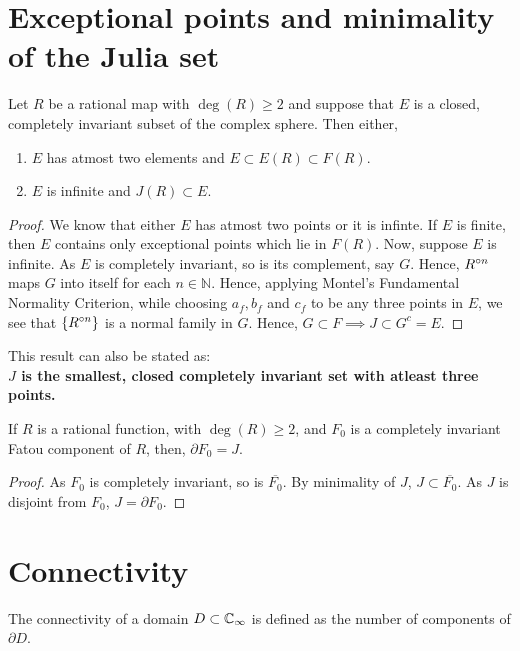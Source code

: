 \section{Exceptional points and minimality of the Julia set}
\begin{theorem}
	Let \( R \) be a rational map with \( \deg(R)\ge 2 \) and suppose that \( E \) is a closed, completely invariant
	subset of the complex sphere. Then either,
	\begin{enumerate}
		\item \( E \) has atmost two elements and \( E \subset E(R) \subset F(R) \).
		\item \( E \) is infinite and \( J(R) \subset E \).
	\end{enumerate}
\end{theorem}
\begin{proof}
	We know that either \( E \) has atmost two points or it is infinte. If \( E \) is finite, then \( E \) contains
	only exceptional points which lie in \( F(R) \). Now, suppose \( E \) is infinite. As \( E \) is completely invariant, so
	is its complement, say \( G \). Hence, \( \ror[n] \) maps \( G \) into itself for each \( n \in \mathbb{N} \). Hence, applying 
	Montel's Fundamental Normality Criterion, while choosing \( a_f,b_f \) and \( c_f \) to be any three points in \( E \),
we see that \( \{\ror[n]\} \) is a normal family in \( G \). Hence, \( G \subset F \implies J \subset G^c=E \).
\end{proof}
\noindent This result can also be stated as:\\
\textbf{\( J \) is the smallest, closed completely invariant set with atleast three points.}

\begin{corollary}\label{thm1.2}
	If \( R \) is a rational function, with \( \deg(R)\ge 2 \), and \( F_0 \) is
	a completely invariant Fatou component of \( R \), then, \( \partial F_0=J \).
\end{corollary}
\begin{proof}
	As \( F_0 \) is completely invariant, so is \( \overline{F_0}  \). By minimality of \( J \), \( J\subset \overline{F_0}  \).
	As \( J \) is disjoint from \( F_0 \), \( J=\partial F_0 \).
\end{proof}

\section{Connectivity}
\begin{definition}[Connectivity]
	The connectivity of a domain \( D \subset \mathbb{C}_\infty \) is defined as the number
	of components of \( \partial D \).
\end{definition}

